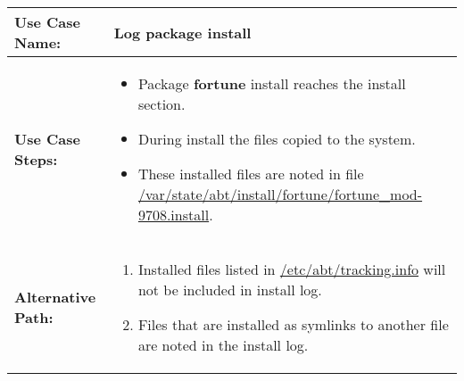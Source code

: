 \medskip

\begin{tabularx}{\linewidth}{|l|X|}
\hline
\textbf{Use Case Name:} & \textbf{Log package install} \\
\hline
\textbf{Use Case Steps:} & 
\begin{minipage}{\linewidth} 
  \vspace{0.05em}
  \begin{itemize}
    \item Package \textbf{fortune} install reaches the install section.
    \item During install the files copied to the system.
    \item These installed files are noted in file \url{/var/state/abt/install/fortune/fortune_mod-9708.install}.
  \end{itemize}
  \vspace{0.05em}
\end{minipage}
\\
\hline 
\textbf{Alternative Path:} &
\begin{minipage}{\linewidth}
  \vspace{0.05em} 
  \begin{enumerate}
    \item Installed files listed in \url{/etc/abt/tracking.info} will not be included in install log.
    \item Files that are installed as symlinks to another file are noted in the install log.
  \end{enumerate}
  \vspace{0.05em} 
\end{minipage}
\\
\hline
\end{tabularx}